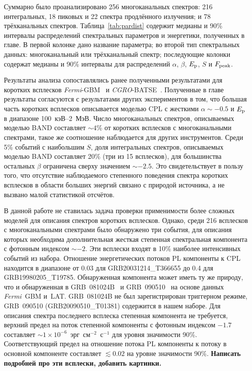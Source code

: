Суммарно было проанализировано 256 многоканальных спектров: 216 интегральных,
18 пиковых и 22 спектра продлённого излучения; и 78 трёхканальных спектров.
Таблица~\ref{tab:pardist} содержит медианы и 90\% интервалы распределений спектральных
параметров и энергетики, полученных в главе. В первой колонке дано название параметра;
во второй тип спектральных данных: многоканальный или трёхканальный спектр;
последующие колонки содержат медианы и 90\% интервалы для распределений
$\alpha$, $\beta$, $E_{\mathrm{p}}$, $S$ и $F_{\mathrm{peak}}$.

Результаты анализа сопоставлялись ранее полученными результатами для коротких всплесков 
\textit{Fermi}-GBM~\citep{Gruber_2014ApJS} и \textit{CGRO}-BATSE~\citep{Goldstein_2013ApJS}.
Полученные в главе результаты согласуются с результатами других экспериментов в том,
что большая часть коротких всплесков описывается моделью CPL с жесткими $\alpha \sim -0.5$
и $E_{\mathrm{p}}$ в диапазоне 100~кэВ--2~МэВ.
Число многоканальных спектров, описываемых моделью BAND составляет $\sim 4$\% от 
коротких всплесков \kws с многоканальными спектрами, такое же соотношение наблюдается
для других инструментов. Среди 5\% событий с наибольшим $S$, доля интегральных спектров,
описываемых моделью BAND составляет 20\% (три из 15 всплесков), для большинства остальных
$\beta$ ограничена сверху значением $\sim -2.5$. Это свидетельствует в пользу того,
что отсутствие наблюдаемого степенного поведения спектра коротких всплесков в области больших
энергий связано с природой источника, а не вызвано малой статистикой отсчётов. 

В данной работе не ставилась задача проверки применимости более сложных моделей
для описания спектров коротких всплесков.
Однако, среди 216 всплесков с многоканальными спектрами было обнаружено три
события, для описания которых необходима дополнительная жесткая степенная 
спектральная компонента с фотонным индексом $\sim -2$. Эти всплески входят в 10\%
наиболее интенсивных событий из набора. Отношение энергетических потоков PL
компоненты к CPL находится в диапазоне от 0.03 для GRB20031214\_T366655 до
0.4 для GRB19980205\_T19785. Обнаруженная компонента может иметь ту же природу,
что и обнаруженная в GRB~081024B~\citep{Abdo_2010ApJ_712_558A} и 
GRB~090510~\citep{Ackermann_2010ApJ_716_1178A} на основе данных \textit{Fermi}~GBM и~LAT.
GRB~081024B не был зарегистрирован \kws триггерном режиме, GRB~090510 (GRB20090510\_T01381)
содержится в нашем наборе. Для описания спектра последнего всплеска степенная 
компонента не требуется, верхний предел на поток степенной компоненты с фотонным 
индексом $-1.7$ составляет $\sim 1 \times 10^{-6}$~эрг~см$^{-2}$~с$^{-1}$ для 
уровня значимости 90\%. Соответствующий предел на отношение потока PL компоненты 
к потоку в основной компоненте составляет $\lesssim 0.02$ на уровне значимости 90\%.
\textbf{Написать подробней про эти всплески, добавить картинки.}

